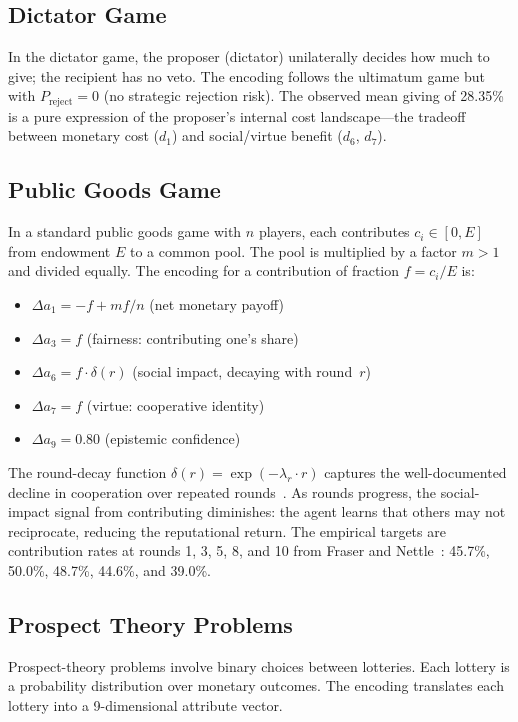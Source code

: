 \documentclass[journal]{IEEEtran}
\begin{document}
\subsection{Dictator Game}

In the dictator game, the proposer (dictator) unilaterally decides how much to give; the recipient has no veto.
The encoding follows the ultimatum game but with $P_{\text{reject}} = 0$ (no strategic rejection risk).
The observed mean giving of 28.35\%~\cite{engel2011} is a pure expression of the proposer's internal cost landscape---the tradeoff between monetary cost ($d_1$) and social/virtue benefit ($d_6$, $d_7$).

\subsection{Public Goods Game}

In a standard public goods game with $n$ players, each contributes $c_i \in [0, E]$ from endowment $E$ to a common pool.
The pool is multiplied by a factor $m > 1$ and divided equally.
The encoding for a contribution of fraction $f = c_i/E$ is:
\begin{itemize}
    \item $\Delta a_1 = -f + mf/n$ (net monetary payoff)
    \item $\Delta a_3 = f$ (fairness: contributing one's share)
    \item $\Delta a_6 = f \cdot \delta(r)$ (social impact, decaying with round~$r$)
    \item $\Delta a_7 = f$ (virtue: cooperative identity)
    \item $\Delta a_9 = 0.80$ (epistemic confidence)
\end{itemize}
The round-decay function $\delta(r) = \exp(-\lambda_r \cdot r)$ captures the well-documented decline in cooperation over repeated rounds~\cite{fehr1999,camerer2003}.
As rounds progress, the social-impact signal from contributing diminishes: the agent learns that others may not reciprocate, reducing the reputational return.
The empirical targets are contribution rates at rounds 1, 3, 5, 8, and 10 from Fraser and Nettle~\cite{fraser2020}: 45.7\%, 50.0\%, 48.7\%, 44.6\%, and 39.0\%.

\subsection{Prospect Theory Problems}

Prospect-theory problems involve binary choices between lotteries.
Each lottery is a probability distribution over monetary outcomes.
The encoding translates each lottery into a 9-dimensional attribute vector.
\end{document}
